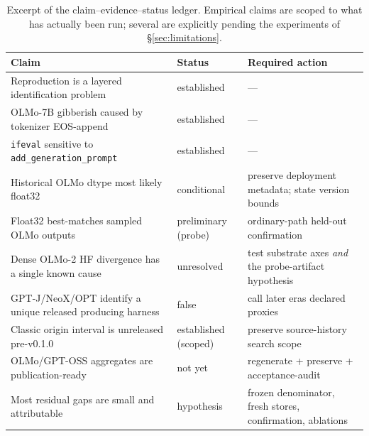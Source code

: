 \begin{table}[h]
\caption{Excerpt of the claim--evidence--status ledger. Empirical claims are
scoped to what has actually been run; several are explicitly pending the
experiments of \S\ref{sec:limitations}.}
\label{tab:ledger}
\begin{center}
\small
\begin{tabularx}{\linewidth}{@{}%
  >{\raggedright\arraybackslash\hsize=1.26\hsize}X
  >{\raggedright\arraybackslash\hsize=0.60\hsize}X
  >{\raggedright\arraybackslash\hsize=1.14\hsize}X@{}}
\toprule
\textbf{Claim} & \textbf{Status} & \textbf{Required action} \\
\midrule
Reproduction is a layered identification problem & established & --- \\
OLMo-7B gibberish caused by tokenizer EOS-append & established & --- \\
\texttt{ifeval} sensitive to \texttt{add\_generation\_prompt} & established & --- \\
Historical OLMo dtype most likely float32 & conditional & preserve deployment
    metadata; state version bounds \\
Float32 best-matches sampled OLMo outputs & preliminary (probe) & ordinary-path
    held-out confirmation \\
Dense OLMo-2 HF divergence has a single known cause & unresolved & test substrate
    axes \emph{and} the probe-artifact hypothesis \\
GPT-J/NeoX/OPT identify a unique released producing harness & false & call later
    eras declared proxies \\
Classic origin interval is unreleased pre-v0.1.0 & established (scoped) & preserve
    source-history search scope \\
OLMo/GPT-OSS aggregates are publication-ready & not yet & regenerate + preserve +
    acceptance-audit \\
Most residual gaps are small and attributable & hypothesis & frozen denominator,
    fresh stores, confirmation, ablations \\
\bottomrule
\end{tabularx}
\end{center}
\end{table}
